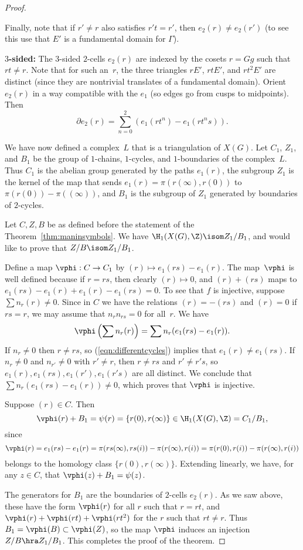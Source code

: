 \documentclass{report}
\begin{document}
\begin{proof}
\begin{itemize}
Finally, note that if $r'\neq r$ also satisfies $r't=r'$, then
$e_2(r) \neq e_2(r')$ (to see this use that $E'$ is a fundamental
domain for $\Gamma$).

%
{\bf $3$-sided:} The $3$-sided $2$-cells $e_2(r)$ are indexed by
the cosets $r=Gg$ such that $rt\neq r$.    Note that for such
an~$r$, the three triangles $rE'$, $rtE'$, and $rt^2E'$ are
distinct (since they are nontrivial translates of a fundamental
domain).  Orient $e_2(r)$ in a way compatible with the $e_1$ (so
edges go from cusps to midpoints).  Then
\[
\partial e_2(r) = \sum_{n=0}^2 \left( e_1(rt^n) - e_1(rt^ns)
\right).
\]

%
\end{itemize}

We have now defined a complex~$L$ that is a triangulation of
$X(G)$. Let $C_1$, $Z_1$, and $B_1$ be the group of $1$-chains,
$1$-cycles, and $1$-boundaries of the complex~$L$.  Thus $C_1$ is
the abelian group generated by the paths $e_1(r)$, the subgroup
$Z_1$ is the kernel of the map that sends
$e_1(r)=\pi(r(\infty),r(0))$ to $\pi(r(0))-\pi((\infty))$, and
$B_1$ is the subgroup of $Z_1$ generated by boundaries of
$2$-cycles.

Let $C, Z, B$ be as defined before the statement of the
Theorem~\ref{thm:maninsymbols}.   We have $\H_1(X(G),\Z) \isom
Z_1/B_1$, and would like to prove that $Z/B \isom Z_1/B_1$.

Define a map $\vphi:C\to C_1$ by $(r)\mapsto e_1(rs) - e_1(r)$.
The map~$\vphi$ is well defined because if $r=rs$, then clearly
$(r)\mapsto 0$, and $(r)+(rs)$ maps to $e_1(rs)-e_1(r) + e_1(r) -
e_1(rs)=0$. To see that $f$ is injective, suppose $\sum n_r
(r)\neq 0$. Since in $C$ we have the relations $(r)=-(rs)$ and
$(r)=0$ if $rs=r$, we may assume that $n_r n_{rs}=0$ for all~$r$.
We have
\[
  \vphi\left(\sum n_r (r)\right) = \sum n_r(e_1(rs) - e_1(r)).
\]
If $n_r\neq 0$ then $r\neq rs$, so (\ref{eqn:differentcycles})
implies that $e_1(r)\neq e_1(rs)$. If $n_r\neq 0$ and $n_{r'}\neq
0$ with $r'\neq r$, then $r\neq rs$ and $r'\neq r's$, so $e_1(r),
e_1(rs), e_1(r'), e_1(r's)$ are all distinct.  We conclude that
$\sum n_r(e_1(rs) - e_1(r))\neq 0$, which proves that $\vphi$ is
injective.

Suppose $(r)\in C$. Then $$\vphi(r) + B_1 = \psi(r) =
\{r(0),r(\infty)\} \in \H_1(X(G),\Z)=C_1/B_1,$$ since $$\vphi(r) =
e_1(rs) - e_1(r) = \pi(rs(\infty),rs(i)) - \pi(r(\infty),r(i)) =
\pi(r(0),r(i)) - \pi(r(\infty),r(i))$$ belongs to the homology
class $\{r(0),r(\infty)\}$.   Extending linearly, we have, for any
$z\in C$, that $\vphi(z) + B_1 = \psi(z)$.

The generators for $B_1$ are the boundaries of $2$-cells $e_2(r)$.
 As we saw above, these have the form $\vphi(r)$ for all $r$ such that
 $r=rt$, and $\vphi(r)+\vphi(rt)+\vphi(rt^2)$ for the $r$ such that $rt\neq r$.
Thus $B_1 = \vphi(B)\subset \vphi(Z)$, so the map $\vphi$ induces
an injection $Z/B \hra Z_1/B_1$.   This completes the proof of the
theorem.

\end{proof}
\end{document}
